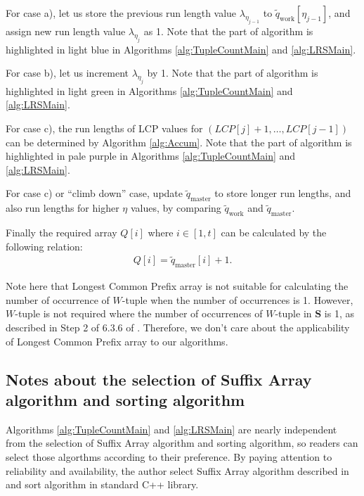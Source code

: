 ﻿\documentclass[a3paper,xelatex,english]{bxjsarticle}
\newcommand\mib[1]{\boldsymbol{#1}}
\begin{document}
For case a), let us store the previous run length value $\lambda_{\eta_{j-1}}$ to $\tilde{q}_{\textrm{work}}[\eta_{j - 1}]$, and assign new run length value $\lambda_{\eta_{j}}$ as 1.
Note that the part of algorithm is highlighted in \colorbox{hlblue!25}{light blue} in Algorithms \ref{alg:TupleCountMain} and \ref{alg:LRSMain}.

For case b), let us increment $\lambda_{\eta_{j}}$ by 1.
Note that the part of algorithm is highlighted in  \colorbox{Pomme!10}{light green} in Algorithms \ref{alg:TupleCountMain} and \ref{alg:LRSMain}.

For case c), the run lengths of LCP values for $(LCP[j] + 1, \ldots, LCP[j - 1])$ can be determined by Algorithm \ref{alg:Accum}.
Note that the part of algorithm is highlighted in  \colorbox{Heliotrope!10}{pale purple} in Algorithms \ref{alg:TupleCountMain} and \ref{alg:LRSMain}.

For case c) or ``climb down'' case, update $\tilde{q}_{\textrm{master}}$ to store longer run lengths, and also run lengths for higher $\eta$ values, by comparing $\tilde{q}_{\textrm{work}}$ and $\tilde{q}_{\textrm{master}}$.

Finally the required array $Q[i]$ where $i \in [1, t]$ can be calculated by the following relation:
\begin{align}
Q[i] = \tilde{q}_{\textrm{master}}[i] + 1.
\end{align}

Note here that Longest Common Prefix array is not suitable for calculating the number of occurrence of $W$-tuple when the number of occurrences is 1.
However, $W$-tuple is not required where the number of occurrences of $W$-tuple in $\mib{S}$ is 1, as described in Step 2 of 6.3.6 of \cite{SP80090B}.
Therefore, we don't care about the applicability of Longest Common Prefix array to our algorithms.

\subsection{Notes about the selection of Suffix Array algorithm and sorting algorithm}
Algorithms \ref{alg:TupleCountMain} and \ref{alg:LRSMain} are nearly independent from the selection of Suffix Array algorithm and sorting algorithm, so readers can select those algorthms according to their preference.
By paying attention to reliability and availability, the author select Suffix Array algorithm described in \cite{MIT} and sort algorithm in standard C++ library.
\clearpage
\end{document}
